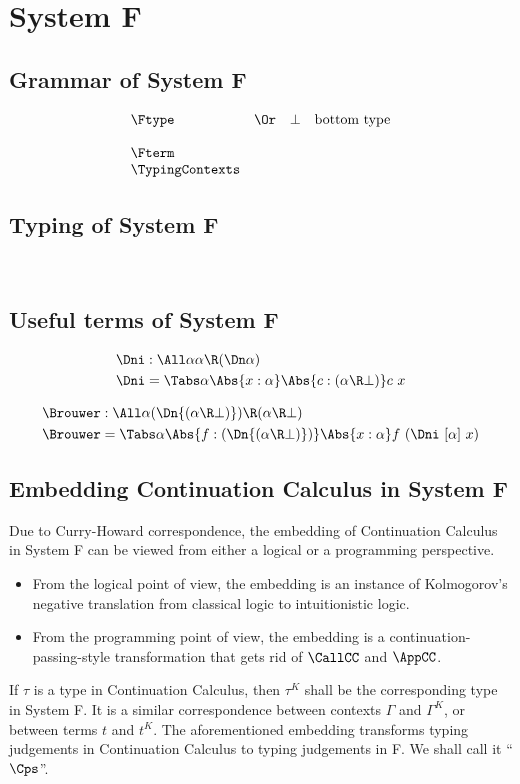 \documentclass{amsart}
\begin{document}
\section{System F}

\subsection{Grammar of System F}

\[
\begin{array}{lclr}
\Ftype
&\Or& \bot & \mbox{bottom type} \\
\\
\Fterm
\\
\TypingContexts
\end{array}
\]

\subsection{Typing of System F}
~

\FRules

\subsection{Useful terms of System F}
\label{sec:f-terms}

\begin{align*}
\Dni & : \All\alpha \alpha \R (\Dn\alpha) \\
\Dni & = \Tabs\alpha \Abs{x:\alpha}
           \Abs{c : (\alpha \R \bot)} c~x
\end{align*}

\begin{align*}
\Brouwer & : \All\alpha (\Dn{(\alpha\R\bot)}) \R (\alpha \R \bot) \\
\Brouwer & = \Tabs\alpha \Abs{f:(\Dn{(\alpha\R\bot)})}
           \Abs{x:\alpha} f~(\Dni~[\alpha]~x)
\end{align*}

\subsection{Embedding Continuation Calculus in System F}

Due to Curry-Howard correspondence, the embedding of
Continuation Calculus in System F can be viewed from either a
logical or a programming perspective.
\begin{itemize}
\item From the logical point of view, the embedding is an
instance of Kolmogorov's negative translation from classical
logic to intuitionistic logic.
\item From the programming point of view, the embedding is a
continuation-passing-style transformation that gets rid of
$\CallCC$ and $\AppCC$.
\end{itemize}
If $\tau$ is a type in Continuation Calculus, then $\tau^K$
shall be the corresponding type in System F. It is a similar
correspondence between contexts $\Gamma$ and $\Gamma^K$, or
between terms $t$ and $t^K$. The aforementioned embedding
transforms typing judgements in Continuation Calculus to typing
judgements in F. We shall call it ``$\Cps$''.
\end{document}
